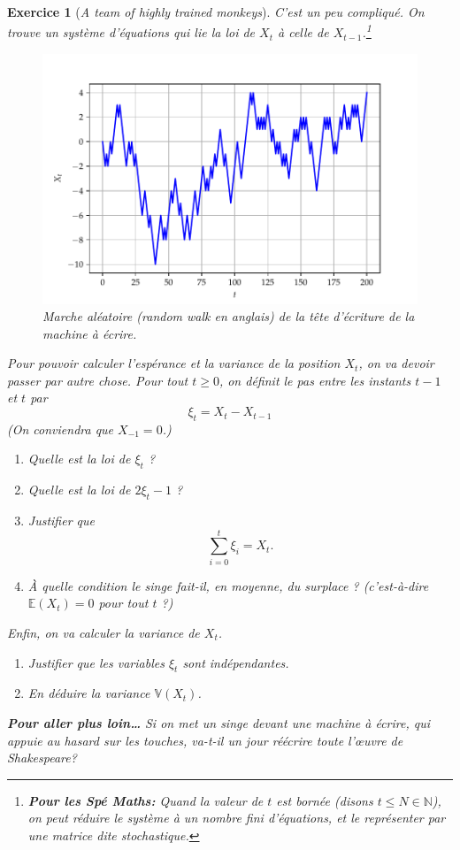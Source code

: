 \documentclass[12pt]{article}
\newcommand{\NN}{\mathbb N}
\newcommand{\EE}{\mathbb E}
\newcommand{\VV}{\mathbb V}
\theoremstyle{margin}
\newtheorem{exer}{Exercice}
\theoremstyle{plain}
\begin{document}
\begin{exer}[\textit{A team of highly trained monkeys}]
C'est un peu compliqué. On trouve un système d'équations qui lie la loi de $X_t$ à celle de $X_{t-1}$.\footnote{\textbf{Pour les Spé Maths:} Quand la valeur de $t$ est bornée (disons $t\leq N\in\NN$), on peut réduire le système à un nombre fini d'équations, et le représenter par une matrice dite \textit{stochastique}.}

\begin{figure}[h]
	\includegraphics[width=\textwidth]{resources/one_monkey.pdf}
	\caption{Marche aléatoire (\textit{random walk} en anglais) de la tête d'écriture de la machine à écrire.}
\end{figure}

Pour pouvoir calculer l'espérance et la variance de la position $X_t$, on va devoir passer par autre chose. Pour tout $t\geq 0$, on définit le \textit{pas} entre les instants $t-1$ et $t$ par
\[
\xi_t = X_t - X_{t-1}
\]
(On conviendra que $X_{-1} = 0$.)

\begin{enumerate}[resume]
\item Quelle est la loi de $\xi_t$ ?
\item[\textbf{Bonus}] Quelle est la loi de $2\xi_t -1$ ?
\item Justifier que 
\[
\sum_{i=0}^{t}\xi_i = X_t.
\]
\item À quelle condition le singe fait-il, en moyenne, du surplace ? (c'est-à-dire $\EE(X_t) = 0$ pour tout $t$ ?)
\end{enumerate}

Enfin, on va calculer la variance de $X_t$.
\begin{enumerate}[resume]
\item Justifier que les variables $\xi_t$ sont indépendantes.
\item En déduire la variance $\VV(X_t)$.
\end{enumerate}


\vspace{1cm}\textbf{Pour aller plus loin\ldots} Si on met un singe devant une machine à écrire, qui appuie au hasard sur les touches, va-t-il un jour réécrire toute l'œuvre de Shakespeare?


\end{exer}
\end{document}
